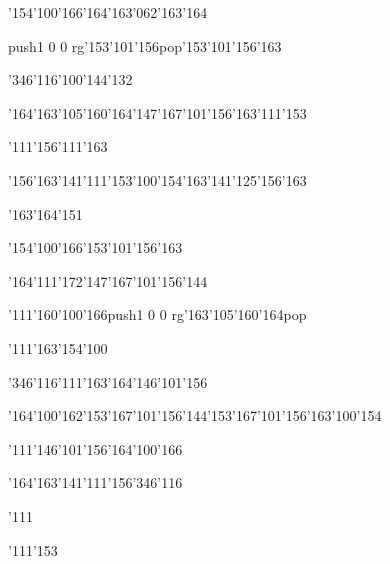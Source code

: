 \null\vfill\ipa\centerline{\enskip\enskip\enskip\enskip\char'154\char'100\char'166\enskip\char'164\char'163\char'062\char'163\char'164}\medskip\centerline{\enskip\enskip\enskip\pdfcolorstack\match push{1 0 0 rg}\char'153\char'101\char'156\pdfcolorstack\match pop{}\enskip\char'153\char'101\char'156\char'163\enskip\enskip\enskip}\medskip\centerline{\enskip\enskip\enskip\enskip\enskip\enskip\enskip\enskip\enskip\enskip\enskip\enskip}\medskip\centerline{\enskip\char'346\char'116\enskip\char'100\char'144\char'132\enskip\enskip\enskip\enskip\enskip\enskip\enskip}\medskip\centerline{\enskip\enskip\enskip\enskip\enskip\char'164\char'163\char'105\char'160\char'164\enskip\char'147\char'167\char'101\char'156\char'163\enskip\char'111\char'153}\medskip\centerline{\enskip\char'111\enskip\char'156\char'111\char'163\enskip\enskip\enskip\enskip\enskip\enskip\enskip\enskip\enskip\enskip\enskip}\medskip\centerline{\enskip\char'156\char'163\char'141\char'111\char'153\enskip\char'100\char'154\enskip\char'163\char'141\char'125\char'156\char'163\enskip\enskip\enskip}\medskip\centerline{\enskip\enskip\enskip\char'163\char'164\char'151\enskip\enskip\enskip\enskip\enskip\enskip}\medskip\centerline{\enskip\enskip\enskip\enskip\enskip\enskip\enskip\char'154\char'100\char'166\enskip\char'153\char'101\char'156\char'163}\medskip\vfill\footline{\hfil\tt\folio\hfil}\eject
\null\vfill\ipa\centerline{\enskip\enskip\enskip\enskip\char'164\char'111\char'172\enskip\char'147\char'167\char'101\char'156\char'144}\medskip\centerline{\enskip\char'111\enskip\char'160\char'100\char'166\enskip\pdfcolorstack\match push{1 0 0 rg}\char'163\char'105\char'160\char'164\pdfcolorstack\match pop{}\enskip\enskip\enskip}\medskip\centerline{\enskip\char'111\enskip\char'163\char'154\char'100\enskip\enskip\enskip\enskip\enskip\enskip}\medskip\centerline{\enskip\char'346\char'116\enskip\char'111\char'163\char'164\enskip\enskip\enskip\enskip\char'146\char'101\char'156}\medskip\centerline{\enskip\char'164\char'100\char'162\enskip\char'153\char'167\char'101\char'156\char'144\enskip\char'153\char'167\char'101\char'156\char'163\enskip\char'100\char'154}\medskip\centerline{\enskip\char'111\enskip\char'146\char'101\char'156\enskip\enskip\enskip\enskip\enskip\char'164\char'100\char'166\enskip\enskip\enskip}\medskip\centerline{\enskip\char'164\char'163\char'141\char'111\char'156\enskip\char'346\char'116\enskip\enskip\enskip\enskip\enskip\enskip\enskip\enskip\enskip}\medskip\centerline{\enskip\char'111\enskip\enskip\enskip\enskip\enskip\enskip\enskip\enskip\enskip\enskip}\medskip\centerline{\enskip\char'111\char'153\enskip\enskip\enskip\enskip\enskip\enskip\enskip\enskip\enskip\enskip\enskip\enskip}\medskip\vfill\footline{\hfil\tt\folio\hfil}\eject
